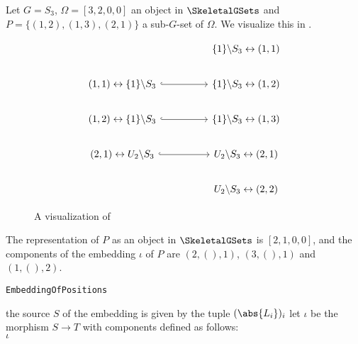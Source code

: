 \begin{exmp}\label{exmp:sub_G_sets}
Let $G = S_3$, $\Omega = [3,2,0,0]$ an object in $\SkeletalGSets$ and $P = \{(1,2),(1,3),(2,1)\}$ a sub-$G$-set of $\Omega$. We visualize this in .
\begin{figure}
\[
\begin{tikzcd}
                                                            &  & \{1\} \backslash S_3   \leftrightarrow (1,1) \\
(1,1) \leftrightarrow \{1\} \backslash S_3 \arrow[rr, hook] &  & \{1\} \backslash S_3   \leftrightarrow (1,2) \\
(1,2) \leftrightarrow \{1\} \backslash S_3 \arrow[rr, hook] &  & \{1\} \backslash S_3   \leftrightarrow (1,3) \\
(2,1) \leftrightarrow U_2 \backslash S_3 \arrow[rr, hook]   &  & U_2 \backslash S_3 \leftrightarrow (2,1) \\
                                                            &  & U_2 \backslash S_3 \leftrightarrow (2,2)
\end{tikzcd}
\]
\caption{A visualization of }\label{fig:exmp:sub_G_sets}
\end{figure}
The representation of $P$ as an object in $\SkeletalGSets$ is $[2,1,0,0]$, and the components of the embedding $\iota$ of $P$ are $(2,(),1)$, $(3,(),1)$ and $(1,(),2)$.
\end{exmp}

\begin{algorithm}\capstart
    \caption{\texttt{EmbeddingOfPositions}}\label{algo:EmbeddingOfPositions}
	\BlankLine
	\BlankLine
	the source $S$ of the embedding is given by the tuple $(\abs{L_i})_i$\;
	\BlankLine
	let $\iota$ be the morphism $S \to T$ with components defined as follows:\\
	\BlankLine
	\Return $\iota$\;
\end{algorithm}

